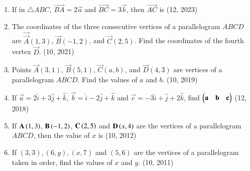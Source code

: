 \begin{enumerate}[label=\thesubsection.\arabic*, ref=\thesubsection.\theenumi]
    \item If in $\triangle ABC$, $\overrightarrow{BA} = 2\vec{a}$ and $\overrightarrow{BC} = 3\vec{b}$, then $\overrightarrow{AC}$ is
    \hfill (12, 2023)
	\item The coordinates of the three consecutive vertices of a parallelogram $ABCD$ are $\vec{\vec{A}}(1, 3)$, $\vec{B}(-1, 2)$, and $\vec{C}(2, 5)$. Find the coordinates of the fourth vertex $\vec{D}$. \hfill (10, 2021)
\item Points $\vec{A}(3, 1)$, $\vec{B}(5, 1)$, $\vec{C}(a, b)$, and $\vec{D}(4, 3)$ are vertices of a parallelogram $ABCD$. Find the values of $a$ and $b$. \hfill (10, 2019)
\item If $\vec{a}=2\hat{i}+3\hat{j}+\hat{k}$, $\vec{b}=\hat{i}-2\hat{j}+\hat{k}$ and $\vec{c}=-3\hat{i}+\hat{j}+2\hat{k}$, find $\begin{pmatrix}\mathbf{a}&\mathbf{b}&\mathbf{c} \end{pmatrix}$
\hfill (12, 2018) 
\item If $\mathbf{A}\left(1,3\right)$, $\mathbf{B}\left(-1,2\right)$, $\mathbf{C}\left(2,5\right)$ and $\mathbf{D}\left(x,4\right)$ are the vertices of a parallelogram $ABCD$, then the value of $x$ is
\hfill (10, 2012)
    \item If $(3,3),(6,y),(x,7)$ and $(5,6)$ are the vertices of a parallelogram taken in order, find the values of $x$ and $y$.
\hfill (10, 2011)
	
\end{enumerate}
